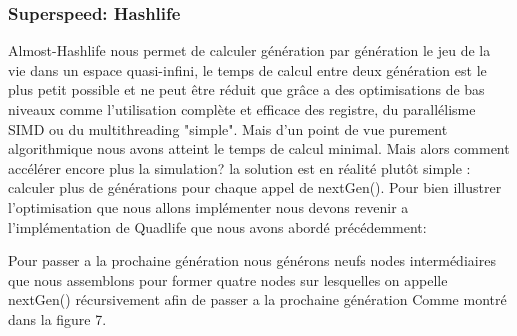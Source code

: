 \subsubsection{Superspeed: Hashlife}
Almost-Hashlife nous permet de calculer génération par génération  le jeu de la vie dans un espace quasi-infini, le temps de calcul entre deux génération est le plus petit possible et ne peut être réduit que grâce a des optimisations de bas niveaux comme l'utilisation complète et efficace des registre, du parallélisme SIMD ou du multithreading "simple". Mais d'un point de vue purement algorithmique nous avons atteint le temps de calcul minimal. Mais alors comment accélérer encore plus la simulation? la solution est en réalité plutôt simple : calculer plus de générations pour chaque appel de nextGen(). Pour bien illustrer l'optimisation que nous allons implémenter nous devons revenir a l'implémentation de Quadlife que nous avons abordé précédemment:

Pour passer a la prochaine génération nous générons neufs nodes intermédiaires que nous assemblons pour former quatre nodes sur lesquelles on appelle nextGen() récursivement afin de passer a la prochaine génération Comme montré dans la figure 7.

